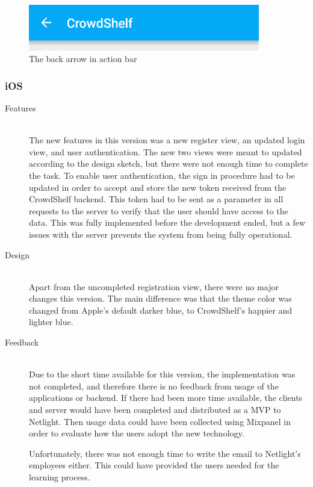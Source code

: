 \begin{description}
\begin{figure}
\centering
\includegraphics[height=2cm]{figs/v06/backArrow.png}
\caption{The back arrow in action bar}
\label{fig:AndroidBackButton}
\end{figure}

\end{description}

\subsubsection{iOS}
\begin{description}
    \item[Features] \hfill\\
The new features in this version was a new register view, an updated login view, and user authentication. The new two views were meant to updated according to the design sketch, but there were not enough time to complete the task. To enable user authentication, the sign in procedure had to be updated in order to accept and store the new token received from the CrowdShelf \gls{backend}. This token had to be sent as a parameter in all requests to the server to verify that the user should have access to the data. This was fully implemented before the development ended, but a few issues with the server prevents the system from being fully operational.  

    \item[Design] \hfill\\
Apart from the uncompleted registration view, there were no major changes this version. The main difference was that the theme color was changed from Apple's default darker blue, to CrowdShelf's happier and lighter blue.


    \item[Feedback] \hfill\\
Due to the short time available for this version, the implementation was not completed, and therefore there is no feedback from usage of the applications or \gls{backend}. If there had been more time available, the clients and server would have been completed and distributed as a \gls{MVP} to Netlight. Then usage data could have been collected using Mixpanel in order to evaluate how the users adopt the new technology.

Unfortunately, there was not enough time to write the email to Netlight's employees either. This could have provided the users needed for the learning process.
\end{description}


